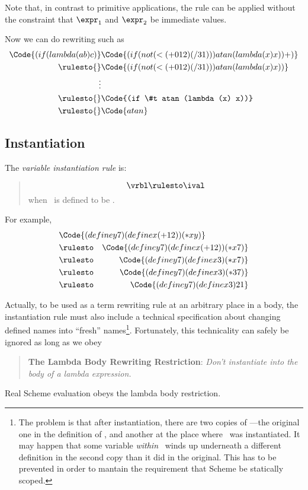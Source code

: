 \documentclass[11pt]{article}
\begin{document}
Note that, in contrast to primitive applications, the  rule can
be applied without the constraint that $\expr_{1}$ and $\expr_{2}$ be
immediate values.

Now we can do rewriting such as
\begin{align*}
\Code{(if (lambda (a b) c) }
    &\Code{(if (not (< (+ 0 1 2) (/ 3 1))) atan (lambda (x) x)) +)}\\
{}\rulesto{} & \Code{(if (not (< (+ 0 1 2) (/ 3 1))) atan (lambda (x) x))}\\
\vdots\\
\rulesto{} & \Code{(if \#t atan (lambda (x) x))}\\
\rulesto{} & \Code{atan}
\end{align*}

\subsection{Instantiation}
The {\em variable instantiation rule\/} is:
\begin{quote}
\[\vrbl \rulesto \ival\]
when \vrbl\ is defined to be \ival.
\end{quote}

For example,
\begin{eqnarray*}
\lefteqn{\Code{(define y 7) (define x (+ 1 2)) (* x y)}}\\
{} & \rulesto & \Code{(define y 7) (define x (+ 1 2)) (* x 7)}\\
{} & \rulesto & \Code{(define y 7) (define x 3) (* x 7)}\\
{} & \rulesto & \Code{(define y 7) (define x 3) (* 3 7)}\\
{} & \rulesto & \Code{(define y 7) (define x 3) 21}
\end{eqnarray*}

Actually, to be used as a term rewriting rule at an arbitrary place in a
body, the instantiation rule must also include a technical specification
about changing defined names into ``fresh'' names\footnote{The problem is
that after instantiation, there are two copies of \ival---the original one
in the definition of \vrbl, and another at the place where \vrbl\ was
instantiated.  It may happen that some variable {\em within} \ival\ winds
up underneath a different definition in the second copy than it did in the
original.  This has to be prevented in order to mantain the requirement
that Scheme be statically scoped.}.  Fortunately, this technicality can
safely be ignored as long as we obey
\begin{quote}
{\bf The Lambda Body Rewriting Restriction}: {\em Don't instantiate into
the body of a lambda expression.}
\end{quote}
Real Scheme evaluation obeys the lambda body restriction.
\end{document}
